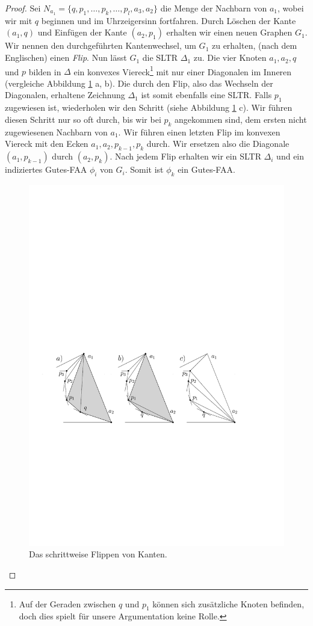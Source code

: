 \begin{proof}
Sei $N_{a_1} = \{q,p_1,\ldots,p_k,\ldots,p_l,a_3,a_2\}$ die Menge der Nachbarn von $a_1$, wobei wir mit $q$ beginnen und im Uhrzeigersinn fortfahren. Durch Löschen der Kante $(a_1,q)$ und Einfügen der Kante $(a_2,p_1)$ erhalten wir einen neuen Graphen $G_1$. Wir nennen den durchgeführten Kantenwechsel, um $G_1$ zu erhalten, (nach dem Englischen) einen \textit{Flip}. Nun lässt $G_1$ die SLTR $\Delta_1$ zu. Die vier Knoten $a_1,a_2,q$ und $p$ bilden in $\Delta$ ein konvexes Viereck\footnote{Auf der Geraden zwischen $q$ und $p_1$ können sich zusätzliche Knoten befinden, doch dies spielt für unsere Argumentation keine Rolle.} mit nur einer Diagonalen im Inneren (vergleiche Abbildung \ref{pic_lem6_2} a, b). Die durch den Flip, also das Wechseln der Diagonalen, erhaltene Zeichnung $\Delta_1$ ist somit ebenfalls eine SLTR. Falls $p_1$ zugewiesen ist, wiederholen wir den Schritt (siehe Abbildung \ref{pic_lem6_2} c). Wir führen diesen Schritt nur so oft durch, bis wir bei $p_k$ angekommen sind, dem ersten nicht zugewiesenen Nachbarn von $a_1$. Wir führen einen letzten Flip im konvexen Viereck mit den Ecken $a_1,a_2,p_{k-1},p_k$ durch. Wir ersetzen also die Diagonale $(a_1,p_{k-1})$ durch $(a_2,p_{k})$. Nach jedem Flip erhalten wir ein SLTR $\Delta_i$ und ein indiziertes Gutes-FAA $\phi_i$ von $G_i$. Somit ist $\phi_k$ ein Gutes-FAA.

\begin{figure}
	\centering
	  \includegraphics[width=1\textwidth]{lem6_2.pdf}
    	\caption{Das schrittweise Flippen von Kanten.}
    	\label{pic_lem6_2}
\end{figure}


\end{proof}
